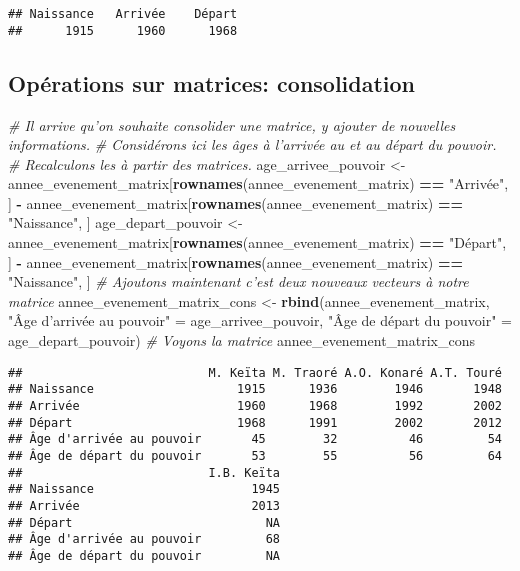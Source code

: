 \documentclass[]{book}
\newenvironment{Shaded}{\begin{snugshade}}{\end{snugshade}}
\newcommand{\KeywordTok}[1]{\textcolor[rgb]{0.13,0.29,0.53}{\textbf{#1}}}
\newcommand{\StringTok}[1]{\textcolor[rgb]{0.31,0.60,0.02}{#1}}
\newcommand{\CommentTok}[1]{\textcolor[rgb]{0.56,0.35,0.01}{\textit{#1}}}
\newcommand{\OperatorTok}[1]{\textcolor[rgb]{0.81,0.36,0.00}{\textbf{#1}}}
\newcommand{\NormalTok}[1]{#1}
\begin{document}
\begin{verbatim}
## Naissance   Arrivée    Départ 
##      1915      1960      1968
\end{verbatim}

\normalsize

\subsection{Opérations sur matrices:
consolidation}\label{operations-sur-matrices-consolidation}

\tiny

\begin{Shaded}
\begin{Highlighting}[]
\CommentTok{# Il arrive qu'on souhaite consolider une matrice, y ajouter de nouvelles informations.}
\CommentTok{# Considérons ici les âges à l'arrivée au et au départ du pouvoir.}
\CommentTok{# Recalculons les à partir des matrices.}
\NormalTok{age_arrivee_pouvoir <-}\StringTok{ }\NormalTok{annee_evenement_matrix[}\KeywordTok{rownames}\NormalTok{(annee_evenement_matrix) }\OperatorTok{==}\StringTok{ "Arrivée"}\NormalTok{, ] }\OperatorTok{-}\StringTok{ }
\StringTok{  }\NormalTok{annee_evenement_matrix[}\KeywordTok{rownames}\NormalTok{(annee_evenement_matrix) }\OperatorTok{==}\StringTok{ "Naissance"}\NormalTok{, ]}
\NormalTok{age_depart_pouvoir <-}\StringTok{ }\NormalTok{annee_evenement_matrix[}\KeywordTok{rownames}\NormalTok{(annee_evenement_matrix) }\OperatorTok{==}\StringTok{ "Départ"}\NormalTok{, ] }\OperatorTok{-}\StringTok{ }
\StringTok{  }\NormalTok{annee_evenement_matrix[}\KeywordTok{rownames}\NormalTok{(annee_evenement_matrix) }\OperatorTok{==}\StringTok{ "Naissance"}\NormalTok{, ]}
\CommentTok{# Ajoutons maintenant c'est deux nouveaux vecteurs à notre matrice}
\NormalTok{annee_evenement_matrix_cons <-}\StringTok{ }\KeywordTok{rbind}\NormalTok{(annee_evenement_matrix, }
                                     \StringTok{"Âge d'arrivée au pouvoir"}\NormalTok{ =}\StringTok{  }\NormalTok{age_arrivee_pouvoir, }
                                     \StringTok{"Âge de départ du pouvoir"}\NormalTok{ =}\StringTok{ }\NormalTok{age_depart_pouvoir)}
\CommentTok{# Voyons la matrice}
\NormalTok{annee_evenement_matrix_cons}
\end{Highlighting}
\end{Shaded}

\begin{verbatim}
##                          M. Keïta M. Traoré A.O. Konaré A.T. Touré
## Naissance                    1915      1936        1946       1948
## Arrivée                      1960      1968        1992       2002
## Départ                       1968      1991        2002       2012
## Âge d'arrivée au pouvoir       45        32          46         54
## Âge de départ du pouvoir       53        55          56         64
##                          I.B. Keïta
## Naissance                      1945
## Arrivée                        2013
## Départ                           NA
## Âge d'arrivée au pouvoir         68
## Âge de départ du pouvoir         NA
\end{verbatim}
\end{document}
